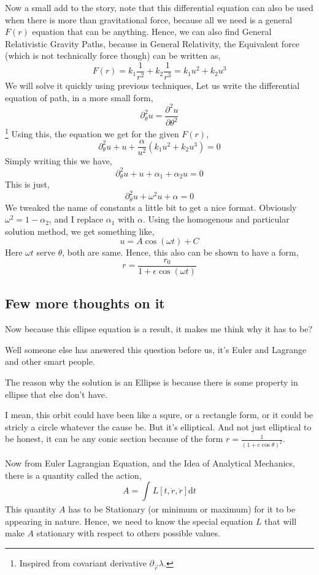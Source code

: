 \documentclass[11pt,a4paper]{article}
\begin{document}
Now a small add to the story, note  that this differential equation can also be used when there is more than gravitational force, because all we need is a general $F(r)$ equation that can be anything. Hence, we can also find General Relativistic Gravity Paths, because in General Relativity, the Equivalent force (which is not technically force though) can be written as,
\[ 
    F(r) = k_1 \frac{1}{r^2} + k_2 \frac{1}{r^3} = k_1 u^2 + k_2 u^3
\]
We will solve it quickly using previous techniques, 
Let us write the differential equation of path, in a more small form,
\[ 
\partial_\theta^2 u = \frac{\partial ^2u}{\partial \theta^2}
\]\footnote{ Inspired from covariant derivative $\partial_{ \vec{r} } \lambda$. }
Using this, the equation we get for the given $F\left( r \right) $, 
\[ 
    \partial_\theta^2 u + u + \frac{\alpha}{u^2} \left( k_1 u^2 + k_2 u ^3\right) = 0
\]
Simply writing this we have,
\[ 
\partial_\theta^2 u + u + \alpha_1  + \alpha_2 u=0
\]
This is just,
\[ 
\partial_\theta^2 u + \omega^2 u + \alpha = 0
\]
We tweaked the name of constants a little bit  to get a nice format. Obviously $\omega^2 = 1 - \alpha_2$, and I replace $\alpha_1$ with $\alpha$. Using the homogenous and particular solution method, we get something like,
\[ 
    u = A \cos\left( \omega t \right) + C
\] Here $\omega t $ serve $\theta$, both are same. 
Hence, this also can be shown to have a form,
\[ 
    r = \frac{r_0}{1 + \epsilon \cos\left( \omega t \right) }
\]







\subsection{ Few more thoughts on it }  
Now because this ellipse equation is a result, it makes me think why it has to be?

Well someone else has answered this question before us, it's Euler and Lagrange and other smart people.

The reason why the solution is an Ellipse is because there is some property in ellipse that else don't have.

I mean, this orbit could have been like a squre, or a rectangle form, or it could be stricly a circle whatever the cause be. But it's elliptical. And not just elliptical to be honest, it can be any conic section because of the form $r = \frac{1}{\left( 1+ e \cos \theta \right) ^2}$. 

Now from Euler Lagrangian Equation, and the Idea of Analytical Mechanics, there is a quantity called the action,
\[ 
    A = \int_{ }^{} L[t, \dot{r}, \ddot{ r }] \mathrm{d} t  
\]
This quantity $A$ has to be Stationary (or minimum or maximum) for it to be appearing in nature. Hence, we need to know the special equation $L$ that will make $A $ stationary with respect to others possible values.
\end{document}

